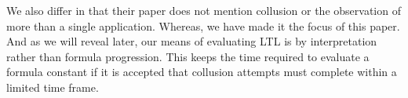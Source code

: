 We also differ in that their paper does not mention collusion or the observation of more than a single application.  Whereas, we have made it the focus of this paper.  And as we will reveal later, our means of evaluating LTL is by interpretation rather than formula progression.  This keeps the time required to evaluate a formula constant if it is accepted that collusion attempts must complete within a limited time frame.  

%
%
%
%
%
%    





